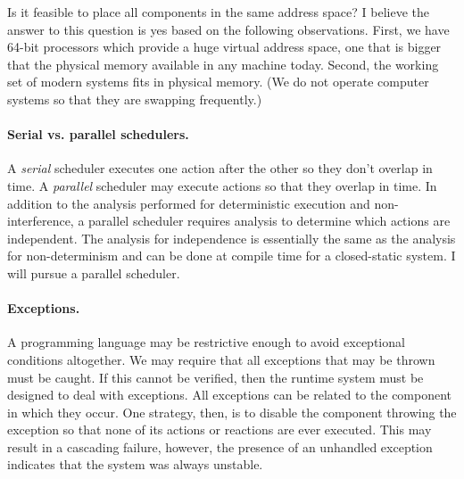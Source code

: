 \documentclass[letterpaper]{article}
\theoremstyle{definition} \newtheorem{constraint}{Constraint}
\begin{document}
Is it feasible to place all components in the same address space?
I believe the answer to this question is yes based on the following observations.
First, we have 64-bit processors which provide a huge virtual address space, one that is bigger that the physical memory available in any machine today.
Second, the working set of modern systems fits in physical memory.
(We do not operate computer systems so that they are swapping frequently.)

\paragraph{Serial vs. parallel schedulers.}
A \emph{serial} scheduler executes one action after the other so they don't overlap in time.
A \emph{parallel} scheduler may execute actions so that they overlap in time.
In addition to the analysis performed for deterministic execution and non-interference, a parallel scheduler requires analysis to determine which actions are independent.
The analysis for independence is essentially the same as the analysis for non-determinism and can be done at compile time for a closed-static system.
I will pursue a parallel scheduler.

\paragraph{Exceptions.}
A programming language may be restrictive enough to avoid exceptional conditions altogether.
We may require that all exceptions that may be thrown must be caught.
If this cannot be verified, then the runtime system must be designed to deal with exceptions.
All exceptions can be related to the component in which they occur.
One strategy, then, is to disable the component throwing the exception so that none of its actions or reactions are ever executed.
This may result in a cascading failure, however, the presence of an unhandled exception indicates that the system was always unstable.
\end{document}
